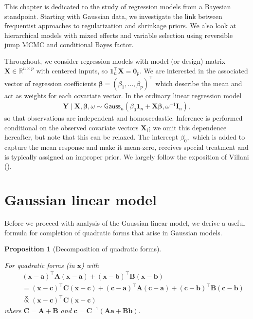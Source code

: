 \documentclass[
  11pt,
  letterpaper,
]{scrbook}
\theoremstyle{plain}
\newtheorem{proposition}{Proposition}[chapter]
\theoremstyle{definition}
\theoremstyle{definition}
\theoremstyle{plain}
\theoremstyle{plain}
\theoremstyle{definition}
\theoremstyle{remark}
\begin{document}
This chapter is dedicated to the study of regression models from a
Bayesian standpoint. Starting with Gaussian data, we investigate the
link between frequentist approaches to regularization and shrinkage
priors. We also look at hierarchical models with mixed effects and
variable selection using reversible jump MCMC and conditional Bayes
factor.

Throughout, we consider regression models with model (or design) matrix
\(\mathbf{X} \in \mathbb{R}^{n \times p}\) with centered inputs, so
\(\mathbf{1}_n^\top\mathbf{X}=\mathbf{0}_p.\) We are interested in the
associated vector of regression coefficients
\(\boldsymbol{\beta} = (\beta_1, \ldots, \beta_p)^\top\) which describe
the mean and act as weights for each covariate vector. In the ordinary
linear regression model \begin{align*}
\boldsymbol{Y} \mid \mathbf{X}, \boldsymbol{\beta}, \omega \sim \mathsf{Gauss}_n(\beta_0\mathbf{1}_n + \mathbf{X}\boldsymbol{\beta}, \omega^{-1}\mathbf{I}_n),
\end{align*} so that observations are independent and homoscedastic.
Inference is performed conditional on the observed covariate vectors
\(\mathbf{X}_i\); we omit this dependence hereafter, but note that this
can be relaxed. The intercept \(\beta_0,\) which is added to capture the
mean response and make it mean-zero, receives special treatment and is
typically assigned an improper prior. We largely follow the exposition
of Villani ().

\section{Gaussian linear model}\label{gaussian-linear-model}

Before we proceed with analysis of the Gaussian linear model, we derive
a useful formula for completion of quadratic forms that arise in
Gaussian models.

\begin{proposition}[Decomposition of quadratic
forms]\protect\hypertarget{prp-quadratic-forms}{}\label{prp-quadratic-forms}

For quadratic forms (in \(\boldsymbol{x}\)) with \begin{align*}
& (\boldsymbol{x} - \boldsymbol{a})^\top \mathbf{A}(\boldsymbol{x} - \boldsymbol{a}) + (\boldsymbol{x} - \boldsymbol{b})^\top \mathbf{B}(\boldsymbol{x} - \boldsymbol{b}) \\\quad &=
 (\boldsymbol{x} - \boldsymbol{c})^\top \mathbf{C}(\boldsymbol{x} - \boldsymbol{c}) + (\boldsymbol{c}-\boldsymbol{a})^\top\mathbf{A}(\boldsymbol{c}-\boldsymbol{a}) + (\boldsymbol{c}-\boldsymbol{b})^\top\mathbf{B}(\boldsymbol{c}-\boldsymbol{b})\\
&\stackrel{\boldsymbol{x}}{\propto} (\boldsymbol{x} - \boldsymbol{c})^\top \mathbf{C}(\boldsymbol{x} - \boldsymbol{c})
\end{align*} where \(\mathbf{C} = \mathbf{A} + \mathbf{B}\) and
\(\boldsymbol{c}= \mathbf{C}^{-1}(\mathbf{A}\boldsymbol{a} + \mathbf{B}\boldsymbol{b}).\)

\end{proposition}
\end{document}
